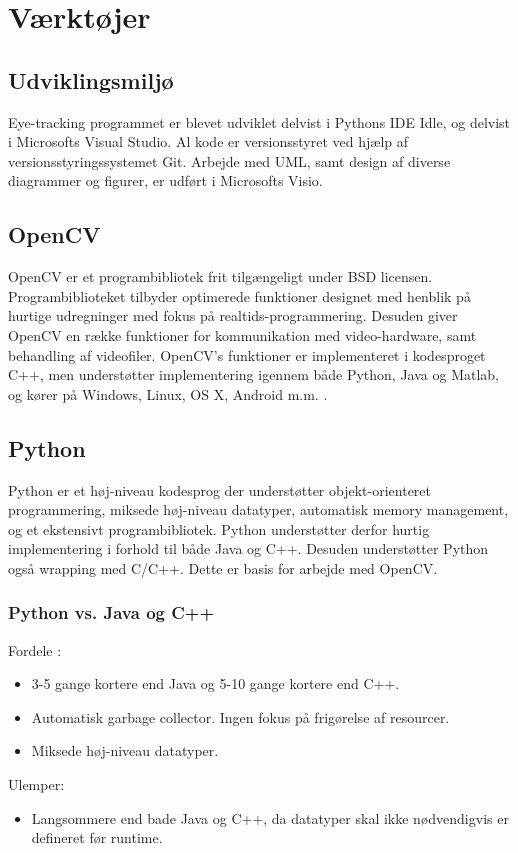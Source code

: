 \documentclass[rapport.tex]{subfiles}
\begin{document}
\section{Værktøjer}
\label{sec:vaerktoejer}
	\subsection{Udviklingsmiljø}
	Eye-tracking programmet er blevet udviklet delvist i Pythons IDE Idle, og delvist i Microsofts Visual Studio. Al kode er versionsstyret ved hjælp af versionsstyringssystemet Git. Arbejde med UML, samt design af diverse diagrammer og figurer, er udført i Microsofts Visio. 
	\subsection{OpenCV}
	OpenCV er et programbibliotek frit tilgængeligt under BSD licensen. Programbiblioteket tilbyder optimerede funktioner designet med henblik på hurtige udregninger med fokus på realtids-programmering. Desuden giver OpenCV en række funktioner for kommunikation med video-hardware, samt behandling af videofiler. OpenCV's funktioner er implementeret i kodesproget C++, men understøtter implementering igennem både Python, Java og Matlab, og kører på Windows, Linux, OS X, Android m.m. \cite{opencv}.
	\subsection{Python}
	Python er et høj-niveau kodesprog der understøtter objekt-orienteret programmering, miksede høj-niveau datatyper, automatisk memory management, og et ekstensivt programbibliotek. 
	Python understøtter derfor hurtig implementering i forhold til både Java og C++. Desuden understøtter Python også wrapping med C/C++. Dette er basis for arbejde med OpenCV.  
	\subsubsection{Python vs. Java og C++} 
	
	Fordele \cite{PythonComp}: \begin{itemize}
		\item 3-5 gange kortere end Java og 5-10 gange kortere end C++. 
		\item Automatisk garbage collector. Ingen fokus på frigørelse af resourcer. 
		\item Miksede høj-niveau datatyper.
	\end{itemize}
	Ulemper: \begin{itemize}
		\item Langsommere end bade Java og C++, da datatyper skal ikke nødvendigvis er defineret før runtime. 
	\end{itemize}
	
\end{document}
